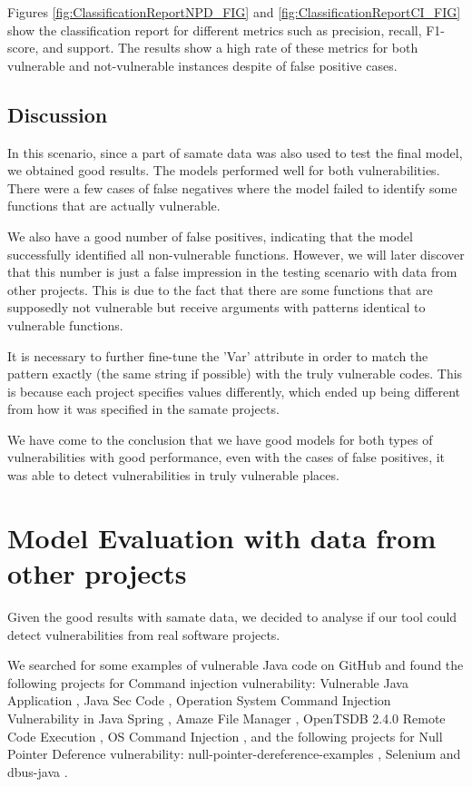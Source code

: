 Figures \ref{fig:ClassificationReportNPD_FIG} and \ref{fig:ClassificationReportCI_FIG} show the classification report for different metrics such as precision, recall, F1-score, and support. The results show a high rate of these metrics for both vulnerable and not-vulnerable instances despite of false positive cases. 

\subsection{Discussion} %
\label{sec:Model_Creat_Eval_Discussion}

In this scenario, since a part of \gls{samate} data was also used to test the final model, we obtained good results. The models performed well for both vulnerabilities. There were a few cases of false negatives where the model failed to identify some functions that are actually vulnerable. 

We also have a good number of false positives, indicating that the model successfully identified all non-vulnerable functions. However, we will later discover that this number is just a false impression in the testing scenario with data from other projects. This is due to the fact that there are some functions that are supposedly not vulnerable but receive arguments with patterns identical to vulnerable functions.

It is necessary to further fine-tune the 'Var' attribute in order to match the pattern exactly (the same string if possible) with the truly vulnerable codes. This is because each project specifies values differently, which ended up being different from how it was specified in the \gls{samate} projects.

We have come to the conclusion that we have good models for both types of vulnerabilities with good performance, even with the cases of false positives, it was able to detect vulnerabilities in truly vulnerable places.




\section{Model Evaluation with data from other projects} %
\label{sec:Model_Eval_Other_Projects}

Given the good results with \gls{samate} data, we decided to analyse if our tool could detect vulnerabilities from real software projects.

We searched for some examples of vulnerable Java code on GitHub and found the following projects for Command injection vulnerability: Vulnerable Java Application \cite{github_Christophe}, Java Sec Code \cite{github_Syclover}, Operation System Command Injection Vulnerability in Java Spring \cite{github_Will}, Amaze File Manager \cite{github_Vishal}, OpenTSDB 2.4.0 Remote Code Execution \cite{github_Chris}, OS Command Injection \cite{github_Utku}, and the following projects for Null Pointer Deference vulnerability: null-pointer-dereference-examples \cite{github_Sridhar}, Selenium \cite{github_Harsha} and dbus-java \cite{github_David}.

